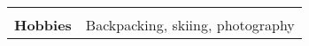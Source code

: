 \documentclass[12pt]{article}
\begin{document}
\begin{table}[H]
\begin{tabularx}{\textwidth}{@{}X p{6.25in} @{}}
		 & \\

		\textbf{Hobbies} & Backpacking, skiing, photography \\
		
	\end{tabularx}
\end{table}
\end{document}
